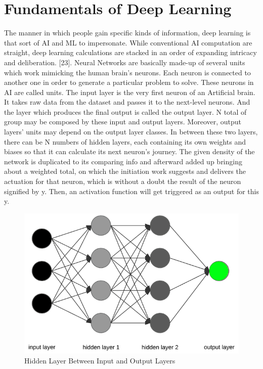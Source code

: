 \section{Fundamentals of Deep Learning}

The manner in which people gain specific kinds of information, deep learning is that sort of AI and ML to impersonate. While conventional AI computation are straight, deep learning calculations are stacked in an order of expanding intricacy and deliberation. [23].
Neural Networks are basically made-up of several units which work mimicking the human brain’s neurons. Each neuron is connected to another one in order to generate a particular problem to solve. These neurons in AI are called units.
The input layer is the very first neuron of an Artificial brain. It takes raw data from the dataset and passes it to the next-level neurons. And the layer which produces the final output is called the output layer. N total of group may be composed by these input and output layers. Moreover, output layers’ units may depend on the output layer classes. In between these two layers, there can be N numbers of hidden layers, each containing its own weights and biases so that it can calculate its next neuron’s journey. The given density of the network is duplicated to its comparing info and afterward added up bringing about a weighted total, on which the initiation work suggests and delivers the actuation for that neuron, which is without a doubt the result of the neuron signified by y. Then, an activation function will get triggered as an output for this y.


\vspace{5mm}
\begin{figure}[hbt!]
\centering
\includegraphics[scale=0.3]{images/fig-4.png}
\caption{Hidden Layer Between Input and Output Layers}
\label{fig:x Hidden Layer Between Input and Output Layers}
\end{figure}

